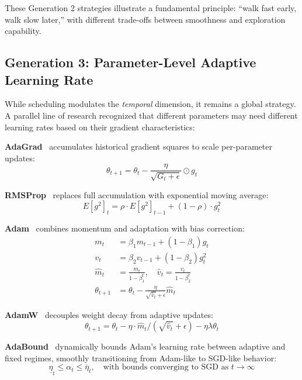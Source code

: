 \documentclass[a4paper,fleqn]{cas-dc}
\begin{document}
These Generation 2 strategies illustrate a fundamental principle: ``walk fast early, walk slow later,'' with different trade-offs between smoothness and exploration capability.

\subsection{Generation 3: Parameter-Level Adaptive Learning Rate}

While scheduling modulates the \emph{temporal} dimension, it remains a global strategy. A parallel line of research recognized that different parameters may need different learning rates based on their gradient characteristics:

\textbf{AdaGrad}~\citet{duchi2011adagrad} accumulates historical gradient squares to scale per-parameter updates:
\begin{equation}\label{eq:adagrad}
\theta_{t+1} = \theta_t - \frac{\eta}{\sqrt{G_t + \epsilon}} \odot g_t
\end{equation}

\textbf{RMSProp}~\citet{tieleman2012rmsprop} replaces full accumulation with exponential moving average:
\begin{equation}\label{eq:rmsprop}
E[g^2]_t = \rho \cdot E[g^2]_{t-1} + (1-\rho) \cdot g_t^2
\end{equation}

\textbf{Adam}~\citet{kingma2015adam} combines momentum and adaptation with bias correction:
\begin{align}
m_t &= \beta_1 m_{t-1} + (1-\beta_1) g_t \nonumber\\
v_t &= \beta_2 v_{t-1} + (1-\beta_2) g_t^2 \label{eq:adam_moments}\\
\hat{m}_t &= \frac{m_t}{1-\beta_1^t}, \quad \hat{v}_t = \frac{v_t}{1-\beta_2^t} \label{eq:adam_bias}\\
\theta_{t+1} &= \theta_t - \frac{\eta}{\sqrt{\hat{v}_t} + \epsilon} \hat{m}_t \label{eq:adam_update}
\end{align}

\textbf{AdamW}~\citet{loshchilov2019decoupled} decouples weight decay from adaptive updates:
\begin{equation}\label{eq:adamw}
\theta_{t+1} = \theta_t - \eta \cdot \hat{m}_t / (\sqrt{\hat{v}_t} + \epsilon) - \eta\lambda\theta_t
\end{equation}

\textbf{AdaBound}~\citet{luo2019adabound} dynamically bounds Adam's learning rate between adaptive and fixed regimes, smoothly transitioning from Adam-like to SGD-like behavior:
\begin{equation}\label{eq:adabound}
\underline{\eta}_t \leq \alpha_t \leq \overline{\eta}_t, \quad \text{with bounds converging to SGD as } t \to \infty
\end{equation}
\end{document}
